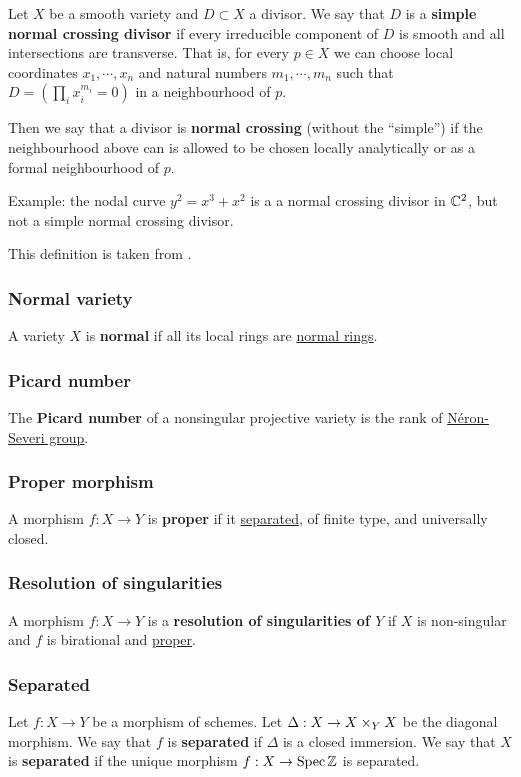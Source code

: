 \documentclass[11pt, english]{article}
\begin{document}
Let $X$ be a smooth variety and $D \subset X$ a divisor. We say that $D$ is a \textbf{simple normal crossing divisor} if every irreducible component of $D$ is smooth and all intersections are transverse. That is, for every $p \in X$ we can choose local coordinates $x_1,\cdots,x_n$ and natural numbers $m_1,\cdots,m_n$ such that $D=\left( \prod_{i} x_i^{m_i} =0 \right)$ in a neighbourhood of $p$.

Then we say that a divisor is \textbf{normal crossing} (without the ``simple'') if the neighbourhood above can is allowed to be chosen locally analytically or as a formal neighbourhood of $p$.

Example: the nodal curve $y^2=x^3+x^2$ is a a normal crossing divisor in $\mathbb{C}^2$, but not a simple normal crossing divisor.

This definition is taken from \cite{kollar_resolution}. 


\subsubsection{Normal variety}
\label{normalvariety}
A variety $X$ is \textbf{normal} if all its local rings are \hyperref[normalring]{normal rings}.

\subsubsection{Picard number}
\label{picardnumber}

The \textbf{Picard number} of a nonsingular projective variety is the rank of \hyperref[neronseveri]{Néron-Severi group}.

\subsubsection{Proper morphism}
\label{proper}
A morphism $f:X \to Y$ is \textbf{proper} if it \hyperref[separated]{separated}, of finite type, and universally closed.

\subsubsection{Resolution of singularities}
\label{resolutionsing}

A morphism $f:X \to Y$ is a \textbf{resolution of singularities of $Y$} if $X$ is non-singular and $f$ is birational and \hyperref[proper]{proper}. 

\subsubsection{Separated}
\label{separated}
Let $f:X \to Y$ be a morphism of schemes. Let $\Delta:X \to X \times_Y X$ be the diagonal morphism. We say that $f$ is \textbf{separated} if $\Delta$ is a closed immersion. We say that $X$ is \textbf{separated} if the unique morphism $f:X \to \operatorname{Spec} \mathbb{Z}$ is separated.
\end{document}
